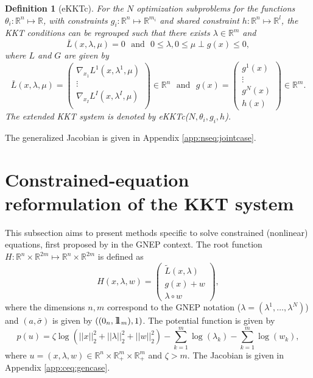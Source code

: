 \documentclass[11pt]{article}
\newcommand{\II}{\mbox{\large 1\hskip -0,353em 1}}
\newcommand{\txtm}[1]{\textrm{~~#1~~}}
\newcommand{\R}{\ensuremath{\mathbb{R}}}
\newtheorem{mydef}{Definition}
\begin{document}
\begin{mydef}[eKKTc]
For the $N$ optimization subproblems for the functions $\theta_i: \R^{n} \mapsto \R$, with constraints $g_i: \R^{n} \mapsto \R^{m_i}$ and shared constraint $h:\R^n \mapsto \R^l$, the KKT conditions can be regrouped such that
there exists $\lambda \in \R^m$ and 
$$
\bar L(x, \lambda, \mu) = 0 \txtm{and} 0 \leq \lambda, 0 \leq \mu \perp g(x) \leq  0,
$$
where $L$ and $G$ are given by
$$
\bar L(x, \lambda, \mu) = 
\left( 
\begin{matrix}
\nabla_{x_1} L ^1(x, \lambda^1, \mu) \\
\vdots \\
\nabla_{x_I} L ^I(x, \lambda^I, \mu) \\
\end{matrix}
\right)  
\in \R^{n}
\txtm{and}
g(x) = 
\left( 
\begin{matrix}
g^1(x) \\
\vdots \\
g^N(x) \\
h(x) 
\end{matrix}
\right) 
\in \R^{m}.
$$
The extended KKT system is denoted by eKKTc($N, \theta_i, g_i, h$).
\end{mydef}
The generalized Jacobian is given in Appendix \ref{app:nseq:jointcase}.



\section{Constrained-equation reformulation of the KKT system}

This subsection aims to present methods specific to solve constrained (nonlinear) equations, first proposed by \cite{kanzowfacchetal11} in the GNEP context.
The root function $H: \R^n \times \R^{2m} \mapsto  \R^n \times \R^{2m}$ is defined as
$$
H(x, \lambda, w) = 
\left( 
\begin{matrix}
\tilde L(x, \lambda) \\
g(x) + w \\
\lambda \circ w 
\end{matrix}
\right) ,
$$
where the dimensions $n, m$ correspond to the GNEP notation ($ \lambda = (\lambda^1, \dots, \lambda^N)$) and $(a, \bar \sigma)$ is given by $((0_{n}, \II_{m}), 1)$. The potential function is given by
$$
p\left(u \right) = \zeta \log\left( ||x||_2^2 + ||\lambda ||_2^2+ ||w||_2^2 \right) - 
\sum_{k=1}^{m} \log (\lambda_{k}) - \sum_{k=1}^{m} \log (w_{k}),
$$
where $u=(x, \lambda, w) \in \R^n \times \R_{+}^{m} \times \R_{+}^{m}$
and $\zeta > m$. 
The Jacobian is given in Appendix \ref{app:ceq:gencase}.
\end{document}
